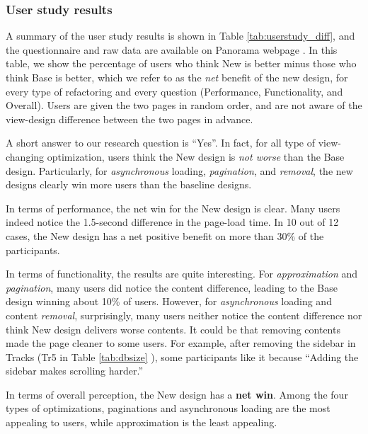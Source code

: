 \subsubsection{User study results}
A summary of the user study results is shown in Table \ref{tab:userstudy_diff}, and the questionnaire and raw data are available on Panorama webpage \cite{userstudydata}.
In this table, we show the percentage of users who
think New is better minus those who think Base is better,
which we refer to as the {\it net} benefit of the new design, for every type of refactoring and every
question (Performance, Functionality, and Overall).
Users are given the two pages in random order, and are not aware of the view-design difference between the two pages in advance.

A short answer to our research question is ``Yes''. In fact, for all type
of view-changing optimization, users think the New design is {\it not worse}
than the Base design. Particularly, for {\it asynchronous} loading,
{\it pagination}, and {\it removal}, the new designs clearly win more users
than the baseline designs.

In terms of performance, the net win for the New design is clear. Many users
indeed notice the 1.5-second difference in the page-load time. In 10 out of 12 cases, 
the New design has a net positive benefit on more than 30\% of the participants.

In terms of functionality, the results are quite interesting. For 
{\it approximation} and {\it pagination}, many users did notice the
content difference, leading to the Base design winning about 10\% of users.
However, for {\it asynchronous} loading and content {\it removal}, surprisingly,
many users neither notice the content difference nor think New design delivers worse contents. It could be that removing contents made the page cleaner to some users. For example, after removing the sidebar in Tracks  (Tr5 in Table \ref{tab:dbsize} ), some participants like it because ``Adding the sidebar makes scrolling harder.'' 

In terms of overall perception, the New design has a {\bf net win}.
Among the four types of optimizations, paginations and asynchronous loading
are the most appealing to users, while approximation is the least appealing.

